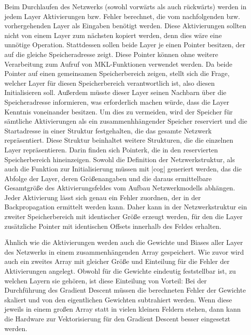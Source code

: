 \documentclass[../main.tex]{subfiles}
\begin{document}
Beim Durchlaufen des Netzwerks (sowohl vorwärts als auch rückwärts) werden in jedem Layer Aktivierungen bzw. Fehler berechnet, die vom nachfolgenden bzw. vorhergehenden Layer als Eingaben benötigt werden. Diese Aktivierungen sollten nicht von einem Layer zum nächsten kopiert werden, denn dies wäre eine unnötige Operation. Stattdessen sollen beide Layer je einen Pointer besitzen, der auf die gleiche Speicheradresse zeigt. Diese Pointer können ohne weitere Verarbeitung zum Aufruf von MKL-Funktionen verwendet werden. Da beide Pointer auf einen gemeinsamen Speicherbereich zeigen, stellt sich die Frage, welcher Layer für diesen Speicherbereich verantwortlich ist, also diesen Initialisieren soll. Außerdem müsste dieser Layer seinen Nachbarn über die Speicheradresse informieren, was erforderlich machen würde, dass die Layer Kenntnis voneinander besitzen. Um dies zu vermeiden, wird der Speicher für sämtliche Aktivierungen als ein zusammenhhängender Speicher reserviert und die Startadresse in einer Struktur festgehalten, die das gesamte Netzwerk repräsentiert. Diese Struktur beinhaltet weitere Strukturen, die die einzelnen Layer repräsentieren. Darin finden sich Pointerk, die in den reservierten Speicherbereich hineinzeigen. Sowohl die Definition der Netzwerkstruktur, als auch die Funktion zur Initialisierung müssen mit |cog| generiert werden, das die Abfolge der Layer, deren Größenangaben und die daraus ermittelbare Gesamtgröße des Aktivierungsfeldes vom Aufbau Netzwerkmodells abhängen. Jeder Aktivierung lässt sich genau ein Fehler zuordnen, der in der Backpropagation ermittelt werden kann. Daher kann in der Netzwerkstruktur ein zweiter Speicherbereich mit identischer Größe erzeugt werden, für den die Layer zusätzliche Pointer mit identischen Offsets innerhalb des Feldes erhalten. 

Ähnlich wie die Aktivierungen werden auch die Gewichte und Biases aller Layer des Netzwerks in einem zusammenhängenden Array gespeichert. Wie zuvor wird auch ein zweites Array mit gleicher Größe und Einteilung für die Fehler der Aktivierungen angelegt. Obwohl für die Gewichte eindeutig feststellbar ist, zu welchen Layern sie gehören, ist diese Einteilung von Vorteil: Bei der Durchführung des Gradient Descent müssen die berechneten Fehler der Gewichte skaliert und von den eigentlichen Gewichten subtrahiert werden. Wenn diese jeweils in einem großen Array statt in vielen kleinen Feldern stehen, dann kann die Hardware zur Vektorisierung für den Gradient Descent besser eingesetzt werden. 
\end{document}
